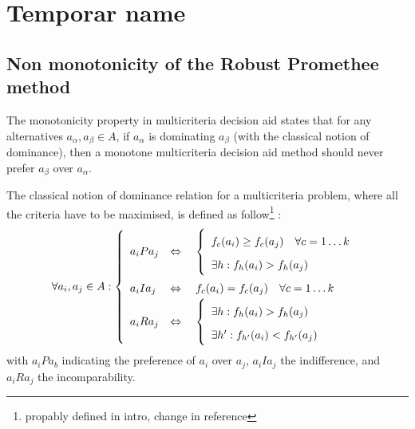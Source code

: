%
\chapter{Temporar name}
\label{chapter2}

\section{Non monotonicity of the Robust Promethee method} 
The monotonicity property in multicriteria decision aid states that for any alternatives 
$a_\alpha, a_\beta \in A$, if $a_\alpha$ is dominating $a_\beta$ (with the classical notion of dominance), then a monotone multicriteria decision aid method should never prefer $a_\beta$ over $a_\alpha$.

The classical notion of dominance relation for a multicriteria problem, where all the criteria have to be maximised, is defined as follow\cite{Brans2016}\footnote{propably defined in intro, change in reference} :
\begin{equation}
  \label{eqn:IP}
  \forall a_i, a_j \in A : \left\{ 
    \renewcommand{\arraystretch}{1.75}
    \begin{array}{l l}
      a_iPa_j  & \Leftrightarrow \quad \left\{ 
          \begin{array}{l l}
              f_c(a_i)\ge f_c(a_j) \quad \forall c=1\dots k \\
              \exists h: f_h(a_i) > f_h(a_j) \\
          \end{array} \right . \\
      a_iIa_j & \Leftrightarrow \quad f_c(a_i) = f_c(a_j) \quad \forall c=1 \dots k \\
      a_iRa_j & \Leftrightarrow \quad \left\{
          \begin{array}{l l}
              \exists h : f_h(a_i) > f_h(a_j) \\
              \exists h' : f_{h'}(a_i)< f_{h'}(a_j) \\
          \end{array} \right . \\
    \end{array} \right . 
\end{equation}
with $a_iPa_b$ indicating the preference of $a_i$ over $a_j$, $a_iIa_j$ the indifference, and $a_iRa_j$ the incomparability.

